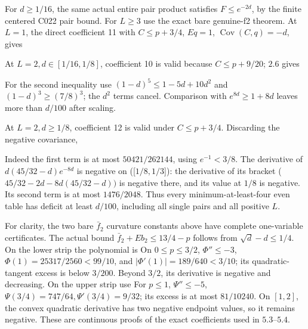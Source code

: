 For \(d\ge1/16\), the same actual entire pair product satisfies
\(F\le e^{-2d}\), by the finite centered C022 pair bound. For \(L\ge3\)
use the exact bare genuine-f2 theorem. At \(L=1\), the direct coefficient
11 with \(C\le p+3/4\), \(Eq=1\), \(\operatorname{Cov}(C,\allowbreak  q)=-d\), gives


At \(L=2,\allowbreak  d\in[1/16,\allowbreak  1/8]\), coefficient 10 is valid because
\(C\le p+9/20\); \(2.6\) gives


For the second inequality use \((1-d)^5\le1-5d+10d^2\) and
\((1-d)^3\ge(7/8)^3\); the \(d^2\) terms cancel. Comparison with
\(e^{8d}\ge1+8d\) leaves more than \(d/100\) after scaling.

At \(L=2,\allowbreak  d\ge1/8\), coefficient 12 is valid under \(C\le p+3/4\).
Discarding the negative covariance,


Indeed the first term is at most \(50421/262144\), using \(e^{-1}<3/8\).
The derivative of \(d(45/32-d)e^{-8d}\) is negative on ([\(1/8,\allowbreak  1/3\)]):
the derivative of its bracket (\(45/32-2d-8d(45/32-d))\) is negative there,
and its value at \(1/8\) is negative. Its second term is at most
\(1476/2048\). Thus every minimum-at-least-four even table has deficit
at least \(d/100\), including all single pairs and all positive \(L\).

For clarity, the two bare \(\bar f_2\) curvature constants above have complete
one-variable certificates. The actual bound
\(\bar f_2+Eb_2\le13/4-p\) follows from
\(\sqrt d-d\le1/4\). On the lower strip the polynomial is
On \(0\le p\le3/2\), \(\Phi''\le-3\),
\(\Phi(1)=25317/2560<99/10\), and
\(|\Phi'(1)|=189/640<3/10\); its quadratic-tangent excess is below
\(3/200\). Beyond \(3/2\), its derivative is negative and decreasing.
On the upper strip use
For \(p\le1\), \(\Psi''\le-5\),
\(\Psi(3/4)=747/64,\allowbreak  \Psi'(3/4)=9/32\); its excess is at most
\(81/10240\). On \([1,\allowbreak  2]\), the convex quadratic derivative has two
negative endpoint values, so it remains negative. These are continuous
proofs of the exact coefficients used in \(5.3\)--\(5.4\).

